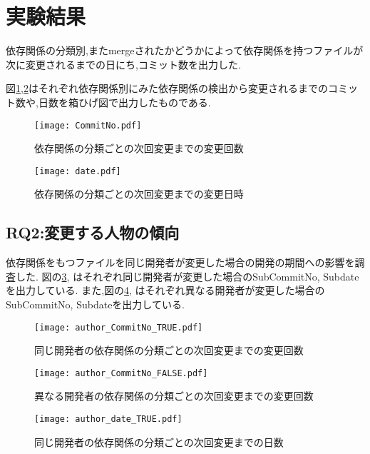 \documentclass[submit,ses,noauthor]{ipsj} %
\begin{document}
\section{実験結果}\label{実験結果}
依存関係の分類別,またmergeされたかどうかによって依存関係を持つファイルが次に変更されるまでの日にち,コミット数を出力した.


図\ref{fig:subNo},\ref{fig:subdate}はそれぞれ依存関係別にみた依存関係の検出から変更されるまでのコミット数や,日数を箱ひげ図で出力したものである.　　

\begin{figure}
\centering
\texttt{[image: CommitNo.pdf]}
\caption{依存関係の分類ごとの次回変更までの変更回数}
\label{fig:subNo} 
\end{figure}

\begin{figure}
\centering
\texttt{[image: date.pdf]}
\caption{依存関係の分類ごとの次回変更までの変更日時}
\label{fig:subdate} 
\end{figure}


\subsection{RQ2:変更する人物の傾向}
依存関係をもつファイルを同じ開発者が変更した場合の開発の期間への影響を調査した.
図の\ref{fig:author_true_subNo},\label{fig:author_true_subdate} はそれぞれ同じ開発者が変更した場合のSubCommitNo, Subdateを出力している.
また,図の\ref{fig:author_false_subNo},\label{fig:author_false_subdate} はそれぞれ異なる開発者が変更した場合のSubCommitNo, Subdateを出力している.


\begin{figure}
\centering
\texttt{[image: author\_CommitNo\_TRUE.pdf]}
\caption{同じ開発者の依存関係の分類ごとの次回変更までの変更回数}
\label{fig:author_true_subNo} 
\end{figure}

\begin{figure}
\centering
\texttt{[image: author\_CommitNo\_FALSE.pdf]}
\caption{異なる開発者の依存関係の分類ごとの次回変更までの変更回数}
\label{fig:author_false_subNo} 
\end{figure}

\begin{figure}
\centering
\texttt{[image: author\_date\_TRUE.pdf]}
\caption{同じ開発者の依存関係の分類ごとの次回変更までの日数}
\label{fig:author_true_subdate} 
\end{figure}
\end{document}
